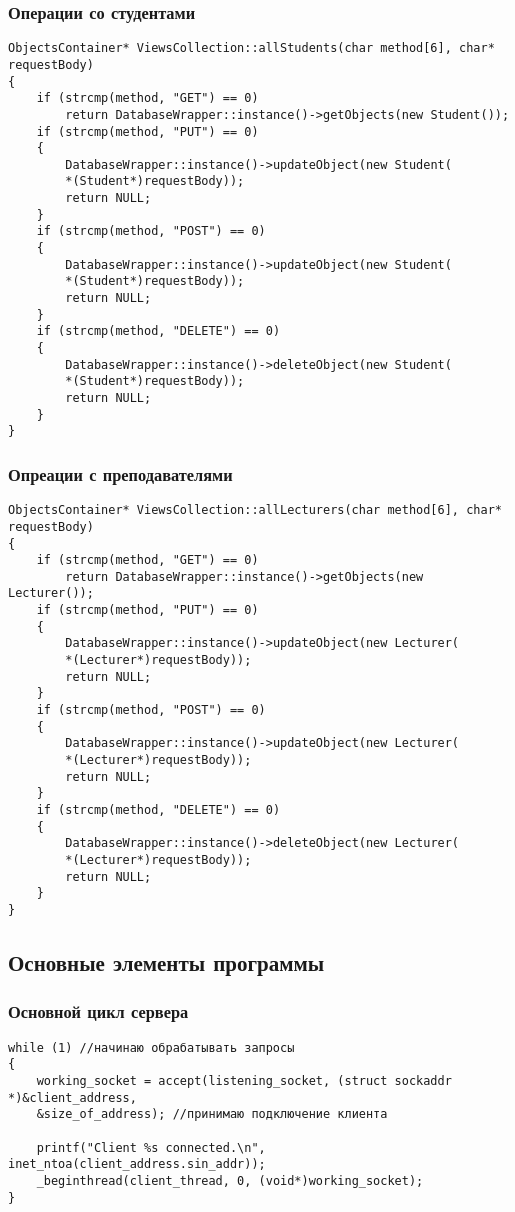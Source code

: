 \subsubsection{Операции со студентами}
\begin{verbatim}
ObjectsContainer* ViewsCollection::allStudents(char method[6], char* requestBody)
{
	if (strcmp(method, "GET") == 0)
		return DatabaseWrapper::instance()->getObjects(new Student());
	if (strcmp(method, "PUT") == 0)
	{
		DatabaseWrapper::instance()->updateObject(new Student(
		*(Student*)requestBody));
		return NULL;
	}
	if (strcmp(method, "POST") == 0)
	{
		DatabaseWrapper::instance()->updateObject(new Student(
		*(Student*)requestBody));
		return NULL;
	}
	if (strcmp(method, "DELETE") == 0)
	{
		DatabaseWrapper::instance()->deleteObject(new Student(
		*(Student*)requestBody));
		return NULL;
	}
}
\end{verbatim}

\subsubsection{Опреации с преподавателями}
\begin{verbatim}
ObjectsContainer* ViewsCollection::allLecturers(char method[6], char* requestBody)
{
	if (strcmp(method, "GET") == 0)
		return DatabaseWrapper::instance()->getObjects(new Lecturer());
	if (strcmp(method, "PUT") == 0)
	{
		DatabaseWrapper::instance()->updateObject(new Lecturer(
		*(Lecturer*)requestBody));
		return NULL;
	}
	if (strcmp(method, "POST") == 0)
	{
		DatabaseWrapper::instance()->updateObject(new Lecturer(
		*(Lecturer*)requestBody));
		return NULL;
	}
	if (strcmp(method, "DELETE") == 0)
	{
		DatabaseWrapper::instance()->deleteObject(new Lecturer(
		*(Lecturer*)requestBody));
		return NULL;
	}
}
\end{verbatim}

\subsection{Основные элементы программы}
\subsubsection{Основной цикл сервера}
\begin{verbatim}
while (1) //начинаю обрабатывать запросы
{
	working_socket = accept(listening_socket, (struct sockaddr *)&client_address, 
	&size_of_address); //принимаю подключение клиента

	printf("Client %s connected.\n", inet_ntoa(client_address.sin_addr));
	_beginthread(client_thread, 0, (void*)working_socket);
}
\end{verbatim}

